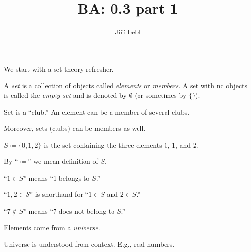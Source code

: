 \documentclass[10pt,aspectratio=149]{beamer}
\author{Ji\v{r}\'i Lebl}
\institute[OSU]{%
Departemento pri Matematiko de Oklahoma {\^S}tata Universitato}
\title{BA: 0.3 part 1}
\date{}
\begin{document}
\begin{frame}
\titlepage
\end{frame}

\begin{frame}
We start with a set theory refresher.

\pause

\begin{definition}
A \emph{set} is a collection of objects called
\emph{elements} or \emph{members}.  A set with
no objects is called the \emph{empty set} and is denoted by
$\emptyset$ (or sometimes by $\{ \}$).
\end{definition}

\pause

Set is a ``club.''  An element can be a member of
several clubs.

Moreover, sets (clubs) can be members as well.

\medskip
\pause

$S \coloneqq \{ 0, 1, 2 \}$
\quad is the set containing
the three elements 0, 1, and 2.

\medskip
\pause

By ``$\coloneqq$'' we mean definition of $S$.

\medskip
\pause

``$1 \in S$''
means ``1 belongs to $S$.''

\medskip
\pause

``$1,2 \in S$'' is shorthand for
``$1 \in S$ and $2 \in S$.''

\medskip
\pause

``$7 \notin S$'' means ``7 does not belong to $S$.''

\medskip
\pause

Elements come from a \emph{universe}.

\medskip
\pause

Universe is understood from context.  E.g., real numbers.

\end{frame}
\end{document}
